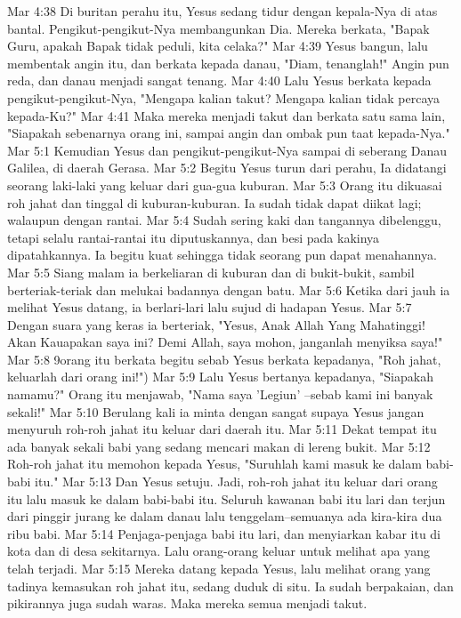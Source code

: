 Mar 4:38  Di buritan perahu itu, Yesus sedang tidur dengan kepala-Nya di atas bantal. Pengikut-pengikut-Nya membangunkan Dia. Mereka berkata, "Bapak Guru, apakah Bapak tidak peduli, kita celaka?"
Mar 4:39  Yesus bangun, lalu membentak angin itu, dan berkata kepada danau, "Diam, tenanglah!" Angin pun reda, dan danau menjadi sangat tenang.
Mar 4:40  Lalu Yesus berkata kepada pengikut-pengikut-Nya, "Mengapa kalian takut? Mengapa kalian tidak percaya kepada-Ku?"
Mar 4:41  Maka mereka menjadi takut dan berkata satu sama lain, "Siapakah sebenarnya orang ini, sampai angin dan ombak pun taat kepada-Nya."
Mar 5:1  Kemudian Yesus dan pengikut-pengikut-Nya sampai di seberang Danau Galilea, di daerah Gerasa.
Mar 5:2  Begitu Yesus turun dari perahu, Ia didatangi seorang laki-laki yang keluar dari gua-gua kuburan.
Mar 5:3  Orang itu dikuasai roh jahat dan tinggal di kuburan-kuburan. Ia sudah tidak dapat diikat lagi; walaupun dengan rantai.
Mar 5:4  Sudah sering kaki dan tangannya dibelenggu, tetapi selalu rantai-rantai itu diputuskannya, dan besi pada kakinya dipatahkannya. Ia begitu kuat sehingga tidak seorang pun dapat menahannya.
Mar 5:5  Siang malam ia berkeliaran di kuburan dan di bukit-bukit, sambil berteriak-teriak dan melukai badannya dengan batu.
Mar 5:6  Ketika dari jauh ia melihat Yesus datang, ia berlari-lari lalu sujud di hadapan Yesus.
Mar 5:7  Dengan suara yang keras ia berteriak, "Yesus, Anak Allah Yang Mahatinggi! Akan Kauapakan saya ini? Demi Allah, saya mohon, janganlah menyiksa saya!"
Mar 5:8  9orang itu berkata begitu sebab Yesus berkata kepadanya, "Roh jahat, keluarlah dari orang ini!")
Mar 5:9  Lalu Yesus bertanya kepadanya, "Siapakah namamu?" Orang itu menjawab, "Nama saya 'Legiun' --sebab kami ini banyak sekali!"
Mar 5:10  Berulang kali ia minta dengan sangat supaya Yesus jangan menyuruh roh-roh jahat itu keluar dari daerah itu.
Mar 5:11  Dekat tempat itu ada banyak sekali babi yang sedang mencari makan di lereng bukit.
Mar 5:12  Roh-roh jahat itu memohon kepada Yesus, "Suruhlah kami masuk ke dalam babi-babi itu."
Mar 5:13  Dan Yesus setuju. Jadi, roh-roh jahat itu keluar dari orang itu lalu masuk ke dalam babi-babi itu. Seluruh kawanan babi itu lari dan terjun dari pinggir jurang ke dalam danau lalu tenggelam--semuanya ada kira-kira dua ribu babi.
Mar 5:14  Penjaga-penjaga babi itu lari, dan menyiarkan kabar itu di kota dan di desa sekitarnya. Lalu orang-orang keluar untuk melihat apa yang telah terjadi.
Mar 5:15  Mereka datang kepada Yesus, lalu melihat orang yang tadinya kemasukan roh jahat itu, sedang duduk di situ. Ia sudah berpakaian, dan pikirannya juga sudah waras. Maka mereka semua menjadi takut.
